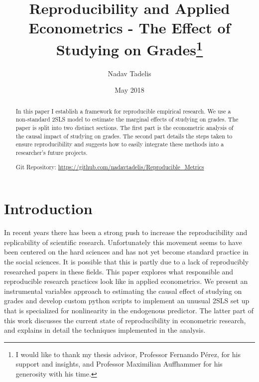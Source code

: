 \documentclass[12pt]{article}
\begin{document}
\title{Reproducibility and Applied Econometrics - The Effect of Studying on Grades\footnote{I would like to thank my thesis advisor, Professor Fernando P\'erez, for his support and insights, and Professor Maximilian Auffhammer for his generosity with his time.}}

\author{Nadav Tadelis}

\date{May 2018}



\maketitle

\hskip 80pt 


\begin{abstract}
In this paper I establish a framework for reproducible empirical research. We use a non-standard 2SLS model to estimate the marginal effects of studying on grades. The paper is split into two distinct sections. The first part is the econometric analysis of the causal impact of studying on grades. The second part details the steps taken to ensure reproducibility and suggests how to easily integrate these methods into a researcher's future projects.

\vspace{3mm}
\noindent Git Repository: \url{https://github.com/nadavtadelis/Reproducible_Metrics}
\end{abstract}

\clearpage


\section{Introduction}
\label{sec_intro}
In recent years there has been a strong push to increase the reproducibility and replicability of scientific research. Unfortunately this movement seems to have been centered on the hard sciences and has not yet become standard practice in the social sciences. It is possible that this is partly due to a lack of reproducibly researched papers in these fields. This paper explores what responsible and reproducible research practices look like in applied econometrics. We present an instrumental variables approach to estimating the causal effect of studying on grades and develop custom python scripts to implement an unusual 2SLS set up that is specialized for nonlinearity in the endogenous predictor. The latter part of this work discusses the current state of reproducibility in econometric research, and explains in detail the techniques implemented in the analysis.
\end{document}

